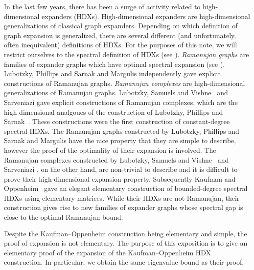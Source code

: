 \documentclass{toc}
\begin{document}
In the last few years, there has been a surge of activity related to high-dimensional expanders (HDXs).
%
High-dimensional  %
expanders are
%
%
high-dimensional generalizations   %
of classical graph expanders.
Depending on which definition of graph expansion is generalized, 
there are several different (and unfortunately, 
%
often  %
%
%
%
inequivalent) definitions of HDXs.
For the %
purposes  %
of this note, we will restrict ourselves to the spectral definition 
of HDXs (see ).
%
\emph{Ramanujan graphs} are families of expander graphs which have optimal spectral expansion (see ). Lubotzky,
Phillips and Sarnak \cite{LubotzkyPS1988} and Margulis \cite{margulis88} independently gave explicit 
constructions of %
Ramanujan graphs. \emph{Ramanujan complexes} are high-dimensional generalizations of Ramanujan graphs. 
Lubotzky, Samuels and Vishne~\cite{LubotzkySV2005-exphdx,LubotzkySV2005-hdx} and 
Sarveniazi \cite{Sarveniazi2007}
gave explicit constructions of %
 Ramanujan complexes, which are the high-dimensional analgoues
of the construction %
of Lubotzky, %
Phillips  %
and Sarnak~\cite{LubotzkyPS1988}.   %
%
%
%
%
%
%
%
%
%
These constructions were  %
the first construction of constant-degree %
spectral HDXs.
The Ramanujan %
graphs constructed by Lubotzky,  %
Phillips and Sarnak \cite{LubotzkyPS1988} and Margulis \cite{margulis88} have the 
nice property that they are simple to describe, 
however %
the proof of the optimality of their %
%
expansion is involved.
%
%
%
%
%
The Ramanujan %
complexes constructed by  %
Lubotzky, Samuels and Vishne~\cite{LubotzkySV2005-exphdx,LubotzkySV2005-hdx} and 
Sarveniazi \cite{Sarveniazi2007}, on the other hand, are non-trivial to describe
and it is difficult to prove their high-dimensional expansion property. %
%
Subsequently Kaufman and Oppenheim~\cite[See STOC version]{KaufmanO2018} gave an
%
%
elegant 
%
elementary construction of bounded-degree %
spectral HDXs using elementary matrices.
%
%
%
%
%
%
While their HDXs are not Ramanujan, their construction gives rise to
new families of expander graphs whose spectral gap is close to the
optimal Ramanujan bound.   %
%
%

Despite %
the Kaufman--Oppenheim   %
construction being elementary and simple, the proof of expansion
%
is  %
not elementary. 
%
%
%
%
%
%
%
%
%
%
%
%
%
%
%
%
%
%
The purpose of this exposition is to give an elementary proof 
%
of the expansion of the Kaufman--Oppenheim HDX construction. 
In particular, we obtain the same eigenvalue bound as their proof.  
%
%
%
%
%
\end{document}
